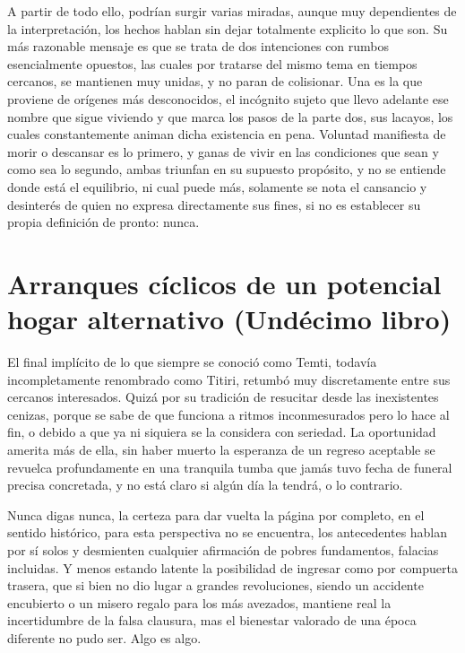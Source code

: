 \documentclass[
]{book}
\begin{document}
A partir de todo ello, podrían surgir varias miradas, aunque muy dependientes de la interpretación, los hechos hablan sin dejar totalmente explicito lo que son. Su más razonable mensaje es que se trata de dos intenciones con rumbos esencialmente opuestos, las cuales por tratarse del mismo tema en tiempos cercanos, se mantienen muy unidas, y no paran de colisionar. Una es la que proviene de orígenes más desconocidos, el incógnito sujeto que llevo adelante ese nombre que sigue viviendo y que marca los pasos de la parte dos, sus lacayos, los cuales constantemente animan dicha existencia en pena. Voluntad manifiesta de morir o descansar es lo primero, y ganas de vivir en las condiciones que sean y como sea lo segundo, ambas triunfan en su supuesto propósito, y no se entiende donde está el equilibrio, ni cual puede más, solamente se nota el cansancio y desinterés de quien no expresa directamente sus fines, si no es establecer su propia definición de pronto: nunca.

\hypertarget{arranques-cuxedclicos-de-un-potencial-hogar-alternativo-unduxe9cimo-libro}{%
\chapter{Arranques cíclicos de un potencial hogar alternativo (Undécimo libro)}\label{arranques-cuxedclicos-de-un-potencial-hogar-alternativo-unduxe9cimo-libro}}

El final implícito de lo que siempre se conoció como Temti, todavía incompletamente renombrado como Titiri, retumbó muy discretamente entre sus cercanos interesados. Quizá por su tradición de resucitar desde las inexistentes cenizas, porque se sabe de que funciona a ritmos inconmesurados pero lo hace al fin, o debido a que ya ni siquiera se la considera con seriedad. La oportunidad amerita más de ella, sin haber muerto la esperanza de un regreso aceptable se revuelca profundamente en una tranquila tumba que jamás tuvo fecha de funeral precisa concretada, y no está claro si algún día la tendrá, o lo contrario.

Nunca digas nunca, la certeza para dar vuelta la página por completo, en el sentido histórico, para esta perspectiva no se encuentra, los antecedentes hablan por sí solos y desmienten cualquier afirmación de pobres fundamentos, falacias incluidas. Y menos estando latente la posibilidad de ingresar como por compuerta trasera, que si bien no dio lugar a grandes revoluciones, siendo un accidente encubierto o un misero regalo para los más avezados, mantiene real la incertidumbre de la falsa clausura, mas el bienestar valorado de una época diferente no pudo ser. Algo es algo.
\end{document}
